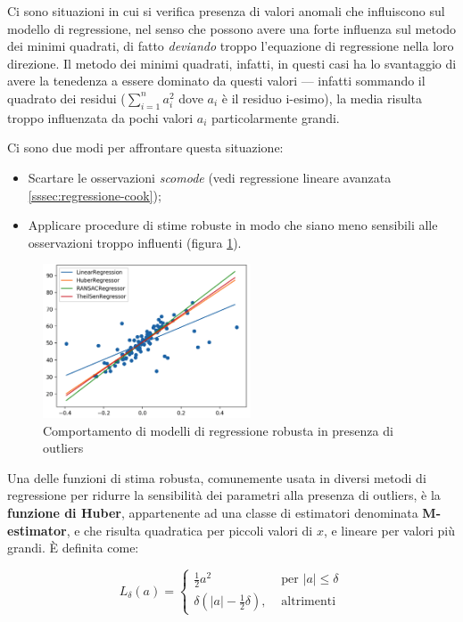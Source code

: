 Ci sono situazioni in cui si verifica presenza di valori anomali che influiscono sul modello di regressione, nel senso che possono avere una forte influenza sul metodo dei minimi quadrati, di fatto \textit{deviando} troppo l'equazione di regressione nella loro direzione. Il metodo dei minimi quadrati, infatti, in questi casi ha lo svantaggio di avere la tenedenza a essere dominato da questi valori — infatti sommando il quadrato dei residui ($\sum_{i=1}^{n} a_i^2$ dove $a_i$ è il residuo i-esimo), la media risulta troppo influenzata da pochi valori $a_i$ particolarmente grandi.

Ci sono due modi per affrontare questa situazione:

\begin{itemize}
  \item Scartare le osservazioni \textit{scomode} (vedi regressione lineare avanzata \ref{sssec:regressione-cook});
  \item Applicare procedure di stime robuste in modo che siano meno sensibili alle osservazioni troppo influenti (figura \ref{fig:reg_rob}).
\end{itemize}

\begin{figure}[H]
\centering
\includegraphics[width=0.55\textwidth,height=\textheight,keepaspectratio]{img/robust.png}
\caption{Comportamento di modelli di regressione robusta in presenza di outliers}
\label{fig:reg_rob}
\end{figure}

Una delle funzioni di stima robusta, comunemente usata in diversi metodi di regressione per ridurre la sensibilità dei parametri alla presenza di outliers, è la \textbf{funzione di Huber}, appartenente ad una classe di estimatori denominata \textbf{M-estimator}, e che risulta quadratica per piccoli valori di $x$, e lineare per valori più grandi. È definita come:

$$L_{\delta}(a)= \begin{cases}\frac{1}{2} a^{2} & \text { per }|a| \leq \delta \\ \delta\left(|a|-\frac{1}{2} \delta\right), & \text { altrimenti }\end{cases}$$\smallskip

